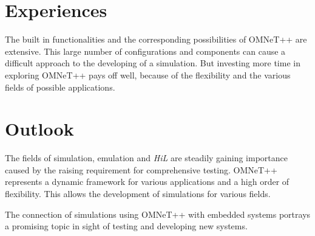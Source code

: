\section{Experiences}
\label{sec:conclusion_experiences}
The built in functionalities and the corresponding possibilities of OMNeT++ are extensive.
This large number of configurations and components can cause a difficult approach to the developing of a simulation.
But investing more time in exploring OMNeT++ pays off well, because of the flexibility and the various fields of possible applications.

\section{Outlook}
\label{sec:conclusion_outlook}
The fields of simulation, emulation and \emph{HiL} are steadily gaining importance caused by the raising requirement for comprehensive testing.
OMNeT++ represents a dynamic framework for various applications and a high order of flexibility.
This allows the development of simulations for various fields.

The connection of simulations using OMNeT++ with embedded systems portrays a promising topic in sight of testing and developing new systems.